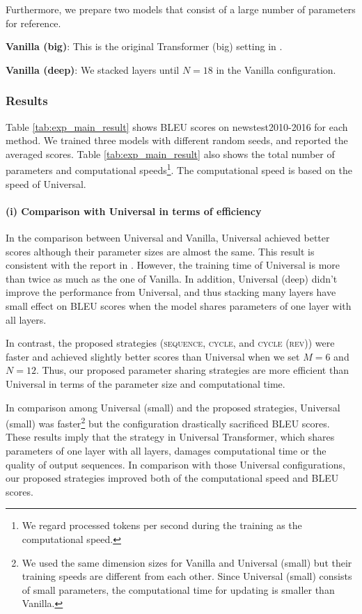 \documentclass[11pt]{article}
\begin{document}
Furthermore, we prepare two models that consist of a large number of parameters for reference.

\noindent\textbf{Vanilla (big)}: This is the original Transformer (big) setting in \cite{NIPS2017_7181}.

\noindent\textbf{Vanilla (deep)}: We stacked layers until $N = 18$ in the Vanilla configuration.


\subsubsection{Results}
Table \ref{tab:exp_main_result} shows BLEU scores on newstest2010-2016 for each method.
We trained three models with different random seeds, and reported the averaged scores.
Table \ref{tab:exp_main_result} also shows the total number of parameters and computational speeds\footnote{We regard processed tokens per second during the training as the computational speed.}.
The computational speed is based on the speed of Universal.


\paragraph{(i) Comparison with Universal in terms of efficiency}
In the comparison between Universal and Vanilla, Universal achieved better scores although their parameter sizes are almost the same.
This result is consistent with the report in \cite{dehghani2019}.
However, the training time of Universal is more than twice as much as the one of Vanilla.
In addition, Universal (deep) didn't improve the performance from Universal, and thus stacking many layers have small effect on BLEU scores when the model shares parameters of one layer with all layers.

In contrast, the proposed strategies (\textsc{sequence}, \textsc{cycle}, and \textsc{cycle (rev)}) were faster and achieved slightly better scores than Universal when we set $M = 6$ and $N = 12$.
Thus, our proposed parameter sharing strategies are more efficient than Universal in terms of the parameter size and computational time.

In comparison among Universal (small) and the proposed strategies, Universal (small) was faster\footnote{We used the same dimension sizes for Vanilla and Universal (small) but their training speeds are different from each other. Since Universal (small) consists of small parameters, the computational time for updating is smaller than Vanilla.} but the configuration drastically sacrificed BLEU scores.
These results imply that the strategy in Universal Transformer, which shares parameters of one layer with all layers, damages computational time or the quality of output sequences.
In comparison with those Universal configurations, our proposed strategies improved both of the computational speed and BLEU scores.
\end{document}
